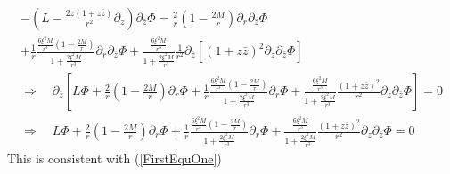 \documentclass[12pt]{article}
\def\nn{\nonumber}
\begin{document}
\begin{gather}
-
\left(L
-
\frac{2 z (1 + z \bar{z})}{r^{2}}
\partial_{z}
\right)
\partial_{\bar{z}}
\Phi
=
\frac{2}{r}
(1 - \frac{2 M}{r})
\partial_{r} \partial_{\bar{z}}
\Phi
\nn \\
+
\frac{1}{r}
\frac{\frac{6 \xi^{2} M}{r^{3}} (1 - \frac{2 M}{r}) }{1 + \frac{2 \xi^{2} M}{r^{3}}}
\partial_{r} \partial_{\bar{z}}\Phi
+
\frac{\frac{6 \xi^{2} M}{r^{3}} }{1 + \frac{2 \xi^{2} M}{r^{3}}}
\frac{1}{r^{2}}
\partial_{\bar{z}}
\left[
(1 + z \bar{z})^{2}
\partial_{z}\partial_{\bar{z}}\Phi
\right]
\nn \\
\Rightarrow
\quad
\partial_{\bar{z}}
\left[
L
\Phi
+
\frac{2}{r}
(1 - \frac{2 M}{r})
\partial_{r}
\Phi
+
\frac{1}{r}
\frac{\frac{6 \xi^{2} M}{r^{3}} (1 - \frac{2 M}{r}) }{1 + \frac{2 \xi^{2} M}{r^{3}}}
\partial_{r} \Phi
+
\frac{\frac{6 \xi^{2} M}{r^{3}} }{1 + \frac{2 \xi^{2} M}{r^{3}}}
\frac{(1 + z \bar{z})^{2}}{r^{2}}
\partial_{z}\partial_{\bar{z}}\Phi
\right]
=0
\nn \\
\Rightarrow
\quad
L
\Phi
+
\frac{2}{r}
(1 - \frac{2 M}{r})
\partial_{r}
\Phi
+
\frac{1}{r}
\frac{\frac{6 \xi^{2} M}{r^{3}} (1 - \frac{2 M}{r}) }{1 + \frac{2 \xi^{2} M}{r^{3}}}
\partial_{r} \Phi
+
\frac{\frac{6 \xi^{2} M}{r^{3}} }{1 + \frac{2 \xi^{2} M}{r^{3}}}
\frac{(1 + z \bar{z})^{2}}{r^{2}}
\partial_{z}\partial_{\bar{z}}\Phi
=0
\end{gather}
This is consistent with (\ref{FirstEquOne})












\end{document}
